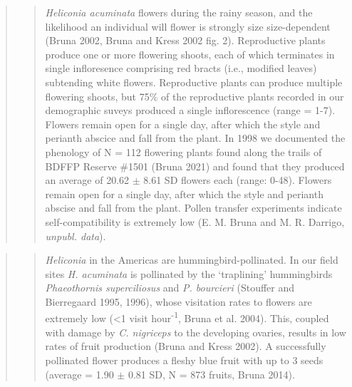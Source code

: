 \documentclass[
  man, donotrepeattitle,floatsintext]{apa6}
\begin{document}
\begin{quote}
\begin{quote}
\emph{Heliconia acuminata} flowers during the rainy season, and the likelihood an individual will flower is strongly size size-dependent (Bruna 2002, Bruna and Kress 2002 fig. 2). Reproductive plants produce one or more flowering shoots, each of which terminates in single infloresence comprising red bracts (i.e., modified leaves) subtending white flowers. Reproductive plants can produce multiple flowering shoots, but 75\% of the reproductive plants recorded in our demographic suveys produced a single inflorescence (range = 1-7). Flowers remain open for a single day, after which the style and perianth abscice and fall from the plant. In 1998 we documented the phenology of N = 112 flowering plants found along the trails of BDFFP Reserve \#1501 (Bruna 2021) and found that they produced an average of 20.62 \(\pm\) 8.61 SD flowers each (range: 0-48). Flowers remain open for a single day, after which the style and perianth abscise and fall from the plant. Pollen transfer experiments indicate self-compatibility is extremely low (E. M. Bruna and M. R. Darrigo, \emph{unpubl. data}).
\end{quote}
\end{quote}

\begin{quote}
\begin{quote}
\emph{Heliconia} in the Americas are hummingbird-pollinated. In our field sites \emph{H. acuminata} is pollinated by the `traplining' hummingbirds \emph{Phaeothornis superciliosus} and \emph{P. bourcieri} (Stouffer and Bierregaard 1995, 1996), whose visitation rates to flowers are extremely low (\textless1 visit hour\textsuperscript{-1}, Bruna et al. 2004). This, coupled with damage by \emph{C. nigriceps} to the developing ovaries, results in low rates of fruit production (Bruna and Kress 2002). A successfully pollinated flower produces a fleshy blue fruit with up to 3 seeds (average = 1.90 \(\pm\) 0.81 SD, N = 873 fruits, Bruna 2014).
\end{quote}
\end{quote}
\end{document}
